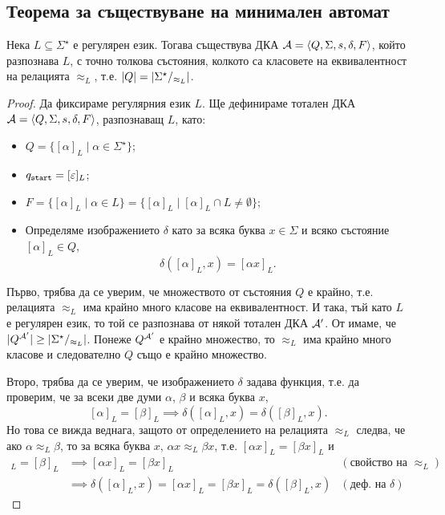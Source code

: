 \subsection{Теорема за съществуване на минимален автомат}

\begin{thm}
  \label{th:myhill-nerode}
  Нека $L\subseteq \Sigma^\star$ е регулярен език.
  Тогава съществува ДКА $\mathcal{A} = \langle{Q,\Sigma,s,\delta,F}\rangle$, който разпознава $L$,
  с точно толкова състояния, колкото са класовете на еквивалентност на релацията $\approx_L$,
  т.е. $\lvert{Q}\rvert = \lvert{\Sigma^\star/_{\approx_L}}\rvert$.
\end{thm}
\begin{proof}
  Да фиксираме регулярния език $L$.
  Ще дефинираме тотален ДКА $\mathcal{A} = \langle{Q,\Sigma,s,\delta,F}\rangle$, разпознаващ $L$, като:
  \begin{itemize}
  \item
    $Q = \{[\alpha]_L\mid \alpha\in \Sigma^\star\}$;
  \item
    $q_{\texttt{start}} = [\varepsilon]_L$;
  \item
    $F = \{[\alpha]_L\mid \alpha\in L\} = \{[\alpha]_L \mid [\alpha]_L \cap L \neq \emptyset\}$;
  \item
    Определяме изображението $\delta$ като 
    за всяка буква $x \in \Sigma$ и всяко състояние $[\alpha]_L\in Q$, 
    \[\delta([\alpha]_L,x) = [\alpha x]_L.\]
  \end{itemize}
  
  Първо, трябва да се уверим, че множеството от състояния $Q$ е крайно, т.е.
  релацията $\approx_L$ има крайно много класове на еквивалентност.
  И така, тъй като $L$ е регулярен език, то той се разпознава от някой тотален ДКА $\mathcal{A}'$.
  От  имаме, че $\lvert{Q^{\mathcal{A}'}}\rvert \geq \lvert{\Sigma^\star/_{\approx_L}}\rvert$.
  Понеже $Q^{\mathcal{A}'}$ е крайно множество, то $\approx_L$ има крайно много класове и 
  следователно $Q$ също е крайно множество.

  Второ, трябва да се уверим, че изображението $\delta$ задава функция, т.е. 
  да проверим, че за всеки две думи $\alpha$, $\beta$ и всяка буква $x$,
  \[[\alpha]_L = [\beta]_L \implies \delta([\alpha]_L,x) = \delta([\beta]_L,x).\]
  Но това се вижда веднага, защото от определението на релацията $\approx_L$ следва, че
  ако $\alpha \approx_L \beta$, то за всяка буква $x$, $\alpha x \approx_L \beta x$,
  т.е. $[\alpha x]_L = [\beta x]_L$ и 
  \begin{align*}
    [\alpha]_L = [\beta]_L & \implies [\alpha x]_L = [\beta x]_L & (\text{свойство на }\approx_L)\\
    & \implies \delta([\alpha]_L,x) = [\alpha x]_L = [\beta x]_L = \delta([\beta]_L,x) & (\text{деф. на }\delta)
  \end{align*}
  

\end{proof}
